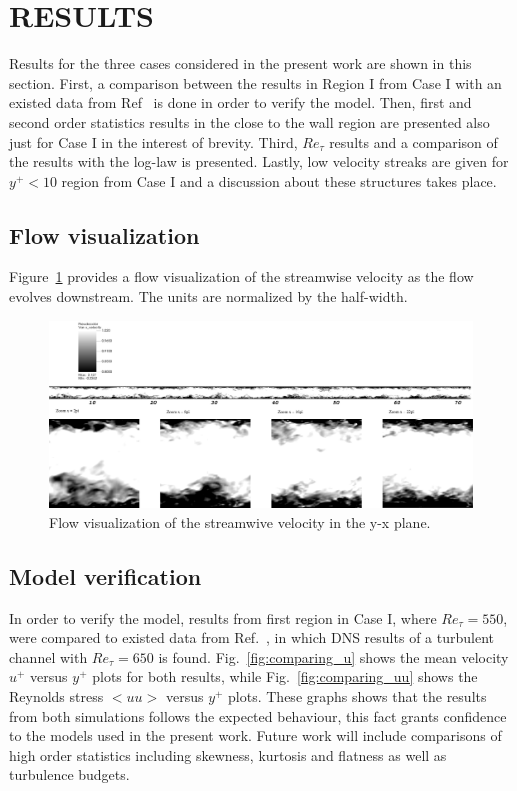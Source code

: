 \documentclass[twocolumn,10pt]{asme2e}
\begin{document}

\section*{RESULTS}

Results for the three cases considered in the present work are shown in this section. First, a comparison between the results in Region I from Case I with an existed data from Ref~\cite{iwamoto2002} is done in order to verify the model. Then, first and second order statistics results in the close to the wall region are presented also just for Case I in the interest of brevity. Third, \(Re_{\tau}\) results and a comparison of the results with the log-law is presented. Lastly, low velocity streaks are given for \(y^+<10\) region from Case I and a discussion about these structures takes place.

\subsection*{Flow visualization}

Figure~\ref{fig:flow_viz} provides a flow visualization of the streamwise velocity as the flow evolves downstream. The units are normalized by the half-width.

\begin{figure}[t]
    \includegraphics[width=\textwidth]{flow_field_x_y_with_label.pdf}
    \caption{Flow visualization of the streamwive velocity in the y-x plane.}
    \label{fig:flow_viz}
\end{figure}

\subsection*{Model verification}

In order to verify the model, results from first region in Case I, where \(Re_{\tau}=550\), were compared to existed data from Ref.~\cite{iwamoto2002}, in which DNS results of a turbulent channel with \(Re_{\tau}=650\) is found. Fig.~\ref{fig:comparing_u} shows the mean velocity \(u^+\) versus \(y^+\) plots for both results, while Fig.~\ref{fig:comparing_uu} shows the Reynolds stress \(<uu>\) versus \(y^+\) plots. These graphs shows that the results from both simulations follows the expected behaviour, this fact grants confidence to the models used in the present work. Future work will include comparisons of high order statistics including skewness, kurtosis and flatness as well as turbulence budgets.
\end{document}
